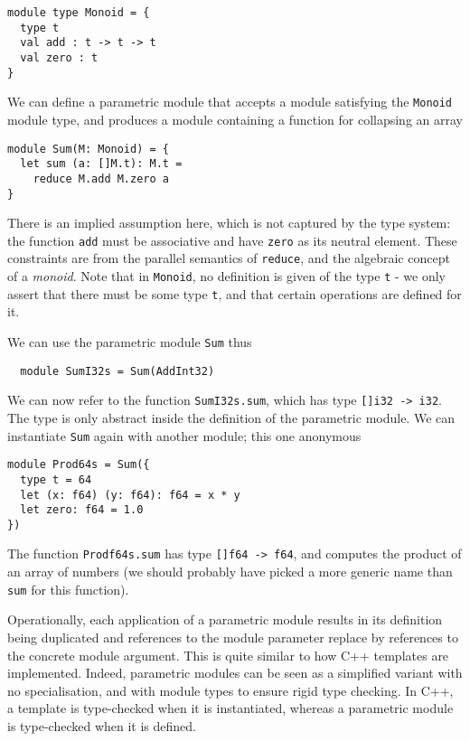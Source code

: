 \documentclass[oneside,11pt]{book}
\begin{document}
\begin{lstlisting}
module type Monoid = {
  type t
  val add : t -> t -> t
  val zero : t
}
\end{lstlisting}

We can define a parametric module that accepts a module satisfying
the \texttt{Monoid} module type, and produces a module containing a
function for collapsing an array

\begin{lstlisting}
module Sum(M: Monoid) = {
  let sum (a: []M.t): M.t =
    reduce M.add M.zero a
}
\end{lstlisting}

There is an implied assumption here, which is not captured by the type
system: the function \texttt{add} must be associative and have
\texttt{zero} as its neutral element.  These constraints are from the
parallel semantics of \texttt{reduce}, and the algebraic concept of a
\textit{monoid}.  Note that in \texttt{Monoid}, no definition is given
of the type \texttt{t} - we only assert that there must be some type
\texttt{t}, and that certain operations are defined for it.

We can use the parametric module \texttt{Sum} thus

\begin{lstlisting}
  module SumI32s = Sum(AddInt32)
\end{lstlisting}

We can now refer to the function \texttt{SumI32s.sum}, which has type
\texttt{[]i32 -> i32}.  The type is only abstract inside the definition of
the parametric module.  We can instantiate \texttt{Sum} again with
another module; this one anonymous

\begin{lstlisting}
module Prod64s = Sum({
  type t = 64
  let (x: f64) (y: f64): f64 = x * y
  let zero: f64 = 1.0
})
\end{lstlisting}

The function \texttt{Prodf64s.sum} has type \texttt{[]f64 -> f64}, and computes
the product of an array of numbers (we should probably have picked a
more generic name than \texttt{sum} for this function).

Operationally, each application of a parametric module results in
its definition being duplicated and references to the module parameter
replace by references to the concrete module argument.  This is quite
similar to how C++ templates are implemented.  Indeed, parametric
modules can be seen as a simplified variant with no specialisation,
and with module types to ensure rigid type checking.  In C++, a
template is type-checked when it is instantiated, whereas a
parametric module is type-checked when it is defined.
\end{document}
